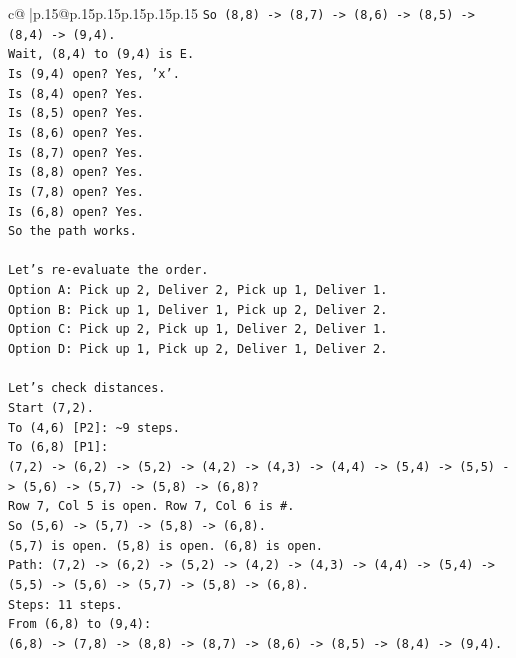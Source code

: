 \documentclass{article}
\begin{document}
{\begin{supertabular}{c@{$\;$}|p{.15\linewidth}@{}p{.15\linewidth}p{.15\linewidth}p{.15\linewidth}p{.15\linewidth}p{.15\linewidth}}
{{{\texttt{So (8,8) {-}> (8,7) {-}> (8,6) {-}> (8,5) {-}> (8,4) {-}> (9,4).} \\
\texttt{Wait, (8,4) to (9,4) is E.} \\
\texttt{Is (9,4) open? Yes, 'x'.} \\
\texttt{Is (8,4) open? Yes.} \\
\texttt{Is (8,5) open? Yes.} \\
\texttt{Is (8,6) open? Yes.} \\
\texttt{Is (8,7) open? Yes.} \\
\texttt{Is (8,8) open? Yes.} \\
\texttt{Is (7,8) open? Yes.} \\
\texttt{Is (6,8) open? Yes.} \\
\texttt{So the path works.} \\
\\ 
\texttt{Let's re{-}evaluate the order.} \\
\texttt{Option A: Pick up 2, Deliver 2, Pick up 1, Deliver 1.} \\
\texttt{Option B: Pick up 1, Deliver 1, Pick up 2, Deliver 2.} \\
\texttt{Option C: Pick up 2, Pick up 1, Deliver 2, Deliver 1.} \\
\texttt{Option D: Pick up 1, Pick up 2, Deliver 1, Deliver 2.} \\
\\ 
\texttt{Let's check distances.} \\
\texttt{Start (7,2).} \\
\texttt{To (4,6) {[}P2{]}: \textasciitilde{}9 steps.} \\
\texttt{To (6,8) {[}P1{]}:} \\
\texttt{(7,2) {-}> (6,2) {-}> (5,2) {-}> (4,2) {-}> (4,3) {-}> (4,4) {-}> (5,4) {-}> (5,5) {-}> (5,6) {-}> (5,7) {-}> (5,8) {-}> (6,8)?} \\
\texttt{Row 7, Col 5 is open. Row 7, Col 6 is \#.} \\
\texttt{So (5,6) {-}> (5,7) {-}> (5,8) {-}> (6,8).} \\
\texttt{(5,7) is open. (5,8) is open. (6,8) is open.} \\
\texttt{Path: (7,2) {-}> (6,2) {-}> (5,2) {-}> (4,2) {-}> (4,3) {-}> (4,4) {-}> (5,4) {-}> (5,5) {-}> (5,6) {-}> (5,7) {-}> (5,8) {-}> (6,8).} \\
\texttt{Steps: 11 steps.} \\
\texttt{From (6,8) to (9,4):} \\
\texttt{(6,8) {-}> (7,8) {-}> (8,8) {-}> (8,7) {-}> (8,6) {-}> (8,5) {-}> (8,4) {-}> (9,4).} \\
}}}
\end{supertabular}}
\end{document}
